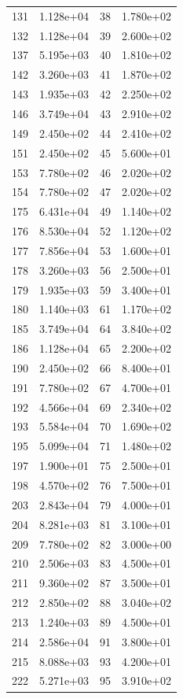 \documentclass[12pt]{article}
\begin{document}
\begin{longtable}{@{}cccc@{}}
131 & 1.128e+04 & 38 & 1.780e+02 \\
132 & 1.128e+04 & 39 & 2.600e+02 \\
137 & 5.195e+03 & 40 & 1.810e+02 \\
142 & 3.260e+03 & 41 & 1.870e+02 \\
143 & 1.935e+03 & 42 & 2.250e+02 \\
146 & 3.749e+04 & 43 & 2.910e+02 \\
149 & 2.450e+02 & 44 & 2.410e+02 \\
151 & 2.450e+02 & 45 & 5.600e+01 \\
153 & 7.780e+02 & 46 & 2.020e+02 \\
154 & 7.780e+02 & 47 & 2.020e+02 \\
175 & 6.431e+04 & 49 & 1.140e+02 \\
176 & 8.530e+04 & 52 & 1.120e+02 \\
177 & 7.856e+04 & 53 & 1.600e+01 \\
178 & 3.260e+03 & 56 & 2.500e+01 \\
179 & 1.935e+03 & 59 & 3.400e+01 \\
180 & 1.140e+03 & 61 & 1.170e+02 \\
185 & 3.749e+04 & 64 & 3.840e+02 \\
186 & 1.128e+04 & 65 & 2.200e+02 \\
190 & 2.450e+02 & 66 & 8.400e+01 \\
191 & 7.780e+02 & 67 & 4.700e+01 \\
192 & 4.566e+04 & 69 & 2.340e+02 \\
193 & 5.584e+04 & 70 & 1.690e+02 \\
195 & 5.099e+04 & 71 & 1.480e+02 \\
197 & 1.900e+01 & 75 & 2.500e+01 \\
198 & 4.570e+02 & 76 & 7.500e+01 \\
203 & 2.843e+04 & 79 & 4.000e+01 \\
204 & 8.281e+03 & 81 & 3.100e+01 \\
209 & 7.780e+02 & 82 & 3.000e+00 \\
210 & 2.506e+03 & 83 & 4.500e+01 \\
211 & 9.360e+02 & 87 & 3.500e+01 \\
212 & 2.850e+02 & 88 & 3.040e+02 \\
213 & 1.240e+03 & 89 & 4.500e+01 \\
214 & 2.586e+04 & 91 & 3.800e+01 \\
215 & 8.088e+03 & 93 & 4.200e+01 \\
222 & 5.271e+03 & 95 & 3.910e+02 \\

\end{longtable}
\end{document}
